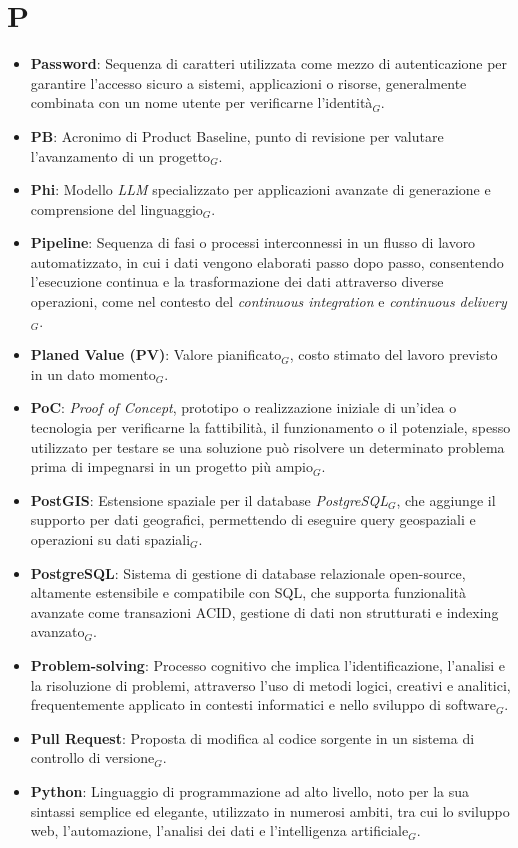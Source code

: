 \section{P}
\begin{itemize}
    \item \textbf{Password}: Sequenza di caratteri utilizzata come mezzo di autenticazione per garantire l'accesso sicuro a sistemi, applicazioni o risorse, generalmente combinata con un nome utente per verificarne l'identità$_G$.
    \item \textbf{PB}: Acronimo di Product Baseline, punto di revisione per valutare l'avanzamento di un progetto$_G$.
    \item \textbf{Phi}: Modello \textit{LLM} specializzato per applicazioni avanzate di generazione e comprensione del linguaggio$_G$.
    \item \textbf{Pipeline}: Sequenza di fasi o processi interconnessi in un flusso di lavoro automatizzato, in cui i dati vengono elaborati passo dopo passo, consentendo l'esecuzione continua e la trasformazione dei dati attraverso diverse operazioni, come nel contesto del \textit{continuous integration} e \textit{continuous delivery}$_G$.
    \item \textbf{Planed Value (PV)}: Valore pianificato$_G$, costo stimato del lavoro previsto in un dato momento$_G$.
    \item \textbf{PoC}: \textit{Proof of Concept}, prototipo o realizzazione iniziale di un'idea o tecnologia per verificarne la fattibilità, il funzionamento o il potenziale, spesso utilizzato per testare se una soluzione può risolvere un determinato problema prima di impegnarsi in un progetto più ampio$_G$.
    \item \textbf{PostGIS}: Estensione spaziale per il database \textit{PostgreSQL}$_G$, che aggiunge il supporto per dati geografici, permettendo di eseguire query geospaziali e operazioni su dati spaziali$_G$.
    \item \textbf{PostgreSQL}: Sistema di gestione di database relazionale open-source, altamente estensibile e compatibile con SQL, che supporta funzionalità avanzate come transazioni ACID, gestione di dati non strutturati e indexing avanzato$_G$.
    \item \textbf{Problem-solving}: Processo cognitivo che implica l'identificazione, l'analisi e la risoluzione di problemi, attraverso l'uso di metodi logici, creativi e analitici, frequentemente applicato in contesti informatici e nello sviluppo di software$_G$.
    \item \textbf{Pull Request}: Proposta di modifica al codice sorgente in un sistema di controllo di versione$_G$.
    \item \textbf{Python}: Linguaggio di programmazione ad alto livello, noto per la sua sintassi semplice ed elegante, utilizzato in numerosi ambiti, tra cui lo sviluppo web, l'automazione, l'analisi dei dati e l'intelligenza artificiale$_G$.
\end{itemize}

